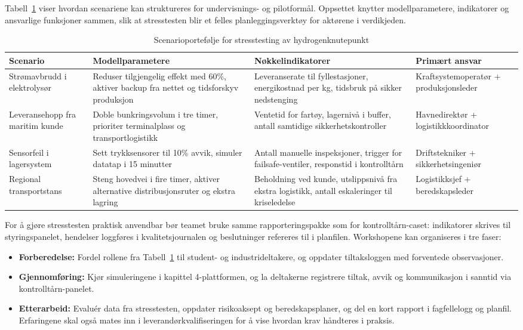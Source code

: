 Tabell~\ref{tab:hydrogenstress} viser hvordan scenariene kan struktureres for undervisnings- og pilotformål. Oppsettet knytter modellparametere, indikatorer og ansvarlige funksjoner sammen, slik at stresstesten blir et felles planleggingsverktøy for aktørene i verdikjeden.

\begin{table}[ht]
    \centering
    \caption{Scenarioportefølje for stresstesting av hydrogenknutepunkt}
    \label{tab:hydrogenstress}
    \begin{tabular}{|p{3.2cm}|p{4.6cm}|p{4.6cm}|p{3.0cm}|}
        \hline
        \textbf{Scenario} & \textbf{Modellparametere} & \textbf{Nøkkelindikatorer} & \textbf{Primært ansvar} \\
        \hline
        Strømavbrudd i elektrolysør & Reduser tilgjengelig effekt med 60\%, aktiver backup fra nettet og tidsforskyv produksjon & Leveranserate til fyllestasjoner, energikostnad per kg, tidsbruk på sikker nedstenging & Kraftsystemoperatør + produksjonsleder \\
        \hline
        Leveransehopp fra maritim kunde & Doble bunkringsvolum i tre timer, prioriter terminalplass og transportlogistikk & Ventetid for fartøy, lagernivå i buffer, antall samtidige sikkerhetskontroller & Havnedirektør + logistikkkoordinator \\
        \hline
        Sensorfeil i lagersystem & Sett trykksensorer til \pm{}10\% avvik, simuler datatap i 15 minutter & Antall manuelle inspeksjoner, trigger for failsafe-ventiler, responstid i kontrolltårn & Driftstekniker + sikkerhetsingeniør \\
        \hline
        Regional transportstans & Steng hovedvei i fire timer, aktiver alternative distribusjonsruter og ekstra lagring & Beholdning ved kunde, utslippsnivå fra ekstra logistikk, antall eskaleringer til kriseledelse & Logistikksjef + beredskapsleder \\
        \hline
    \end{tabular}
\end{table}

For å gjøre stresstesten praktisk anvendbar bør teamet bruke samme rapporteringspakke som for kontrolltårn-caset: indikatorer skrives til styringspanelet, hendelser loggføres i kvalitetsjournalen og beslutninger refereres til i planfilen. Workshopene kan organiseres i tre faser:
\begin{itemize}
    \item \textbf{Forberedelse:} Fordel rollene fra Tabell~\ref{tab:hydrogenstress} til student- og industrideltakere, og oppdater tiltaksloggen med forventede observasjoner.
    \item \textbf{Gjennomføring:} Kjør simuleringene i kapittel 4-plattformen, og la deltakerne registrere tiltak, avvik og kommunikasjon i sanntid via kontrolltårn-panelet.
    \item \textbf{Etterarbeid:} Evaluér data fra stresstesten, oppdater risikoaksept og beredskapsplaner, og del en kort rapport i fagfellelogg og planfil. Erfaringene skal også mates inn i leverandørkvalifiseringen for å vise hvordan krav håndteres i praksis.
\end{itemize}

